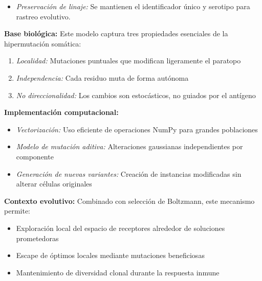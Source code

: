 \begin{enumerate}
\begin{itemize}
    \item \textit{Preservación de linaje:} Se mantienen el identificador único y serotipo para rastreo evolutivo.
\end{itemize}

\noindent \textbf{Base biológica:} Este modelo captura tres propiedades esenciales de la hipermutación somática:
\begin{enumerate}
    \item \textit{Localidad:} Mutaciones puntuales que modifican ligeramente el paratopo
    
    \item \textit{Independencia:} Cada residuo muta de forma autónoma
    
    \item \textit{No direccionalidad:} Los cambios son estocásticos, no guiados por el antígeno
\end{enumerate}

\noindent \textbf{Implementación computacional:}
\begin{itemize}
    \item \textit{Vectorización:} Uso eficiente de operaciones NumPy para grandes poblaciones
    
    \item \textit{Modelo de mutación aditiva:} Alteraciones gaussianas independientes por componente
    
    \item \textit{Generación de nuevas variantes:} Creación de instancias modificadas sin alterar células originales
\end{itemize}

\noindent \textbf{Contexto evolutivo:} Combinado con selección de Boltzmann, este mecanismo permite:
\begin{itemize}
    \item Exploración local del espacio de receptores alrededor de soluciones prometedoras
    
    \item Escape de óptimos locales mediante mutaciones beneficiosas
    
    \item Mantenimiento de diversidad clonal durante la respuesta inmune
\end{itemize}

\end{enumerate}

